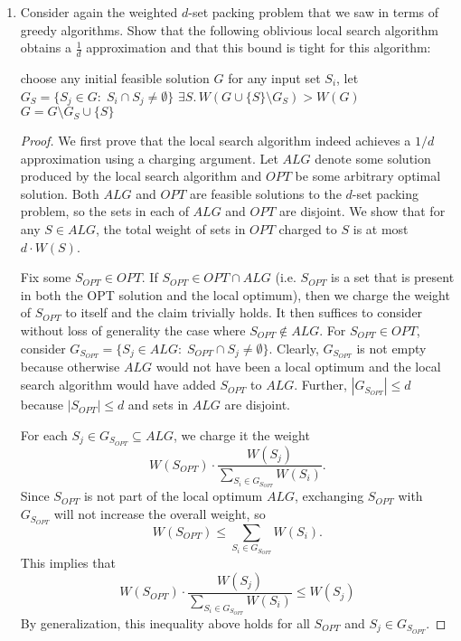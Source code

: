 \documentclass[11pt]{article}
\begin{document}
\begin{enumerate}[leftmargin=16pt]
    \pagebreak

    \item Consider again the weighted $d$-set packing problem that we saw in terms of greedy algorithms. Show that the following oblivious local search algorithm obtains a $\frac{1}{d}$ approximation and that this bound is tight for this algorithm:
    
    \begin{codebox}
        \li choose any initial feasible solution $G$
        \li for any input set $S_i$, let $G_S = \{S_j \in G:\; S_i \cap S_j \neq \emptyset\}$
        \li \While $\exists S.\, W(G \cup \{S\} \setminus G_S) > W(G)$ \Do
            \li $G = G \setminus G_S \cup \{S\}$
        \End
    \end{codebox}
    
    \begin{proof}
        We first prove that the local search algorithm indeed achieves a $1/d$ approximation using a charging argument. Let $ALG$ denote some solution produced by the local search algorithm and $OPT$ be some arbitrary optimal solution. Both $ALG$ and $OPT$ are feasible solutions to the $d$-set packing problem, so the sets in each of $ALG$ and $OPT$ are disjoint. We show that for any $S \in ALG$, the total weight of sets in $OPT$ charged to $S$ is at most $d \cdot W(S)$.

        Fix some $S_{OPT} \in OPT$. If $S_{OPT} \in OPT \cap ALG$ (i.e. $S_{OPT}$ is a set that is present in both the OPT solution and the local optimum), then we charge the weight of $S_{OPT}$ to itself and the claim trivially holds. It then suffices to consider without loss of generality the case where $S_{OPT} \not\in ALG$. For $S_{OPT} \in OPT$, consider $G_{S_{OPT}} = \{S_j \in ALG:\; S_{OPT} \cap S_j \neq \emptyset \}$. Clearly, $G_{S_{OPT}}$ is not empty because otherwise $ALG$ would not have been a local optimum and the local search algorithm would have added $S_{OPT}$ to $ALG$. Further, $|G_{S_{OPT}}| \leq d$ because $|S_{OPT}| \leq d$ and sets in $ALG$ are disjoint.

        For each $S_j \in G_{S_{OPT}} \subseteq ALG$, we charge it the weight
        $$
        W(S_{OPT}) \cdot \frac{W(S_j)}{\sum_{S_i \in G_{S_{OPT}}} W(S_i)}.
        $$
        Since $S_{OPT}$ is not part of the local optimum $ALG$, exchanging $S_{OPT}$ with $G_{S_{OPT}}$ will not increase the overall weight, so
        $$
        W(S_{OPT}) \leq \sum_{S_i \in G_{S_{OPT}}} W(S_i).
        $$
        This implies that
        \begin{equation}
            W(S_{OPT}) \cdot \frac{W(S_j)}{\sum_{S_i \in G_{S_{OPT}}} W(S_i)} \leq W(S_j)
        \end{equation}
        By generalization, this inequality above holds for all $S_{OPT}$ and $S_j \in G_{S_{OPT}}$.


\end{proof}
\end{enumerate}
\end{document}
